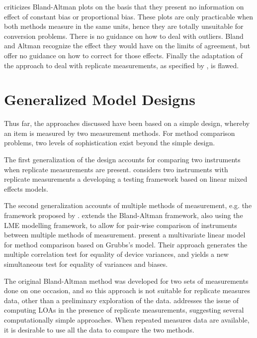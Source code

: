 \documentclass[12pt, a4paper]{report}
\theoremstyle{plain}
\theoremstyle{definition}
\theoremstyle{remark}
\begin{document}
\citet{ludbrook97,ludbrook02} criticizes Bland-Altman plots on the basis that they present no information on effect of constant bias or proportional bias. These plots are only practicable when both methods measure in the same units, hence they are totally
unsuitable for conversion problems. There is no guidance on how to deal with outliers. Bland and Altman recognize the effect they would have on the limits of agreement, but offer no guidance on how to correct for those effects. Finally the adaptation of the approach to deal with replicate measurements, as specified by \citet{BA99}, is flawed.


\section{Generalized Model Designs}
Thus far, the approaches discussed have been based on a simple design, whereby an item is measured by two measurement methods. For method comparison problems, two levels of sophistication exist beyond the simple design. 

The first generalization of the design accounts for comparing two instruments when replicate measurements are present. \citet{ARoy2009} considers two instruments with replicate measurements a developing a testing framework based on linear mixed effects models.

The second generalization accounts of multiple methods of measurement, e.g. the framework proposed by \citet{Grubbs73}. \citet{BXC2008} extends the Bland-Altman framework, also using the LME modelling framework, to allow for pair-wise comparison of instruments between multiple methods of measurement. \citet{christensenblackwood} present a multivariate linear model for method comparison based on Grubbs's model. Their approach generates the multiple  correlation test for equality of device variances, and yields a new simultaneous test for equality of variances and biases.


The original Bland-Altman method was developed for two sets of measurements done on one occasion, and so this approach is not suitable for replicate measures data, other than a preliminary exploration of the data. \citet{BA99} addresses the issue of computing LOAs in the presence of replicate measurements, suggesting several computationally simple approaches. When repeated measures data are available, it is desirable to use all the data to compare the two methods. 
\end{document}
